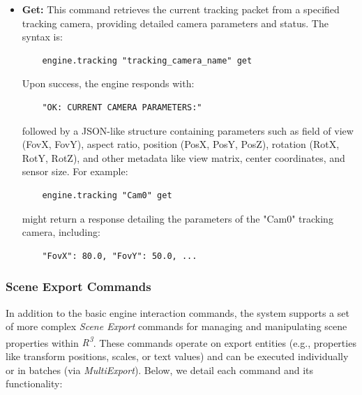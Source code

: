 \begin{itemize}
    \item \textbf{Get:} This command retrieves the current tracking packet from a specified tracking camera, providing detailed camera parameters and status. The syntax is:
    \begin{verbatim}
    engine.tracking "tracking_camera_name" get
    \end{verbatim}
    Upon success, the engine responds with:
    \begin{verbatim}
    "OK: CURRENT CAMERA PARAMETERS:"
    \end{verbatim}
    followed by a JSON-like structure containing parameters such as field of view (FovX, FovY), aspect ratio, position (PosX, PosY, PosZ), rotation (RotX, RotY, RotZ), and other metadata like view matrix, center coordinates, and sensor size. For example:
    \begin{verbatim}
    engine.tracking "Cam0" get
    \end{verbatim}
    might return a response detailing the parameters of the "Cam0" tracking camera, including:
    \begin{verbatim}
    "FovX": 80.0, "FovY": 50.0, ...
    \end{verbatim}
\end{itemize}

\subsubsection{Scene Export Commands}
\noindent In addition to the basic engine interaction commands, the system supports a set of more complex \textit{Scene Export} commands for managing and manipulating scene properties within \textit{R\textsuperscript{3}}. These commands operate on export entities (e.g., properties like transform positions, scales, or text values) and can be executed individually or in batches (via \textit{MultiExport}). Below, we detail each command and its functionality:

